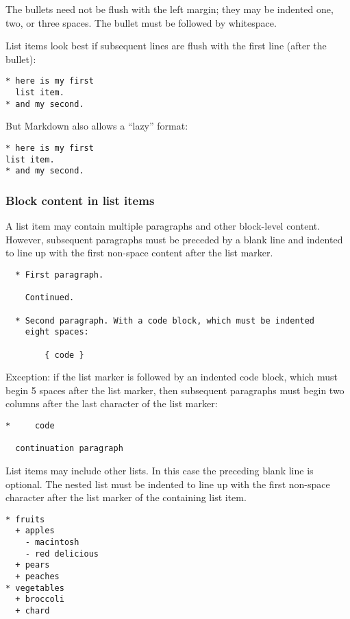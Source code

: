 The bullets need not be flush with the left margin; they may be indented
one, two, or three spaces. The bullet must be followed by whitespace.

List items look best if subsequent lines are flush with the first line
(after the bullet):

\begin{verbatim}
* here is my first
  list item.
* and my second.
\end{verbatim}

But Markdown also allows a ``lazy'' format:

\begin{verbatim}
* here is my first
list item.
* and my second.
\end{verbatim}

\hypertarget{block-content-in-list-items}{%
\subsubsection{Block content in list
items}\label{block-content-in-list-items}}

A list item may contain multiple paragraphs and other block-level
content. However, subsequent paragraphs must be preceded by a blank line
and indented to line up with the first non-space content after the list
marker.

\begin{verbatim}
  * First paragraph.

    Continued.

  * Second paragraph. With a code block, which must be indented
    eight spaces:

        { code }
\end{verbatim}

Exception: if the list marker is followed by an indented code block,
which must begin 5 spaces after the list marker, then subsequent
paragraphs must begin two columns after the last character of the list
marker:

\begin{verbatim}
*     code

  continuation paragraph
\end{verbatim}

List items may include other lists. In this case the preceding blank
line is optional. The nested list must be indented to line up with the
first non-space character after the list marker of the containing list
item.

\begin{verbatim}
* fruits
  + apples
    - macintosh
    - red delicious
  + pears
  + peaches
* vegetables
  + broccoli
  + chard
\end{verbatim}


